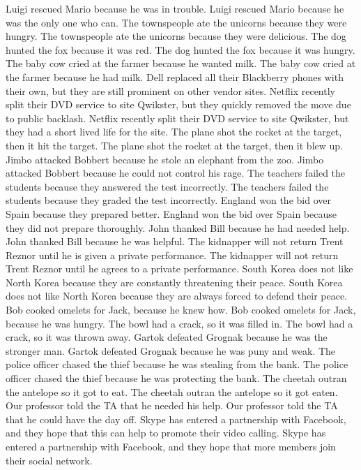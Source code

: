 \documentclass{article}
\begin{document}
\begin{enumerate}
Luigi rescued Mario because he was in trouble.
Luigi rescued Mario because he was the only one who can.
The townspeople ate the unicorns because they were hungry.
The townspeople ate the unicorns because they were delicious.
The dog hunted the fox because it was red.
The dog hunted the fox because it was hungry.
The baby cow cried at the farmer because he wanted milk.
The baby cow cried at the farmer because he had milk.
Dell replaced all their Blackberry phones with their own, but they are still prominent on other vendor sites.
Netflix recently split their DVD service to site Qwikster, but they quickly removed the move due to public backlash.
Netflix recently split their DVD service to site Qwikster, but they had a short lived life for the site.
The plane shot the rocket at the target, then it hit the target.
The plane shot the rocket at the target, then it blew up.
Jimbo attacked Bobbert because he stole an elephant from the zoo.
Jimbo attacked Bobbert because he could not control his rage.
The teachers failed the students because they answered the test incorrectly.
The teachers failed the students because they graded the test incorrectly.
England won the bid over Spain because they prepared better.
England won the bid over Spain because they did not prepare thoroughly.
John thanked Bill because he had needed help.
John thanked Bill because he was helpful.
The kidnapper will not return Trent Reznor until he is given a private performance.
The kidnapper will not return Trent Reznor until he agrees to a private performance.
South Korea does not like North Korea because they are constantly threatening their peace.
South Korea does not like North Korea because they are always forced to defend their peace.
Bob cooked omelets for Jack, because he knew how.
Bob cooked omelets for Jack, because he was hungry.
The bowl had a crack, so it was filled in.
The bowl had a crack, so it was thrown away.
Gartok defeated Grognak because he was the stronger man.
Gartok defeated Grognak because he was puny and weak.
The police officer chased the thief because he was stealing from the bank.
The police officer chased the thief because he was protecting the bank.
The cheetah outran the antelope so it got to eat.
The cheetah outran the antelope so it got eaten.
Our professor told the TA that he needed his help.
Our professor told the TA that he could have the day off.
Skype has entered a partnership with Facebook, and they hope that this can help to promote their video calling.
Skype has entered a partnership with Facebook, and they hope that more members join their social network.

\end{enumerate}
\end{document}
